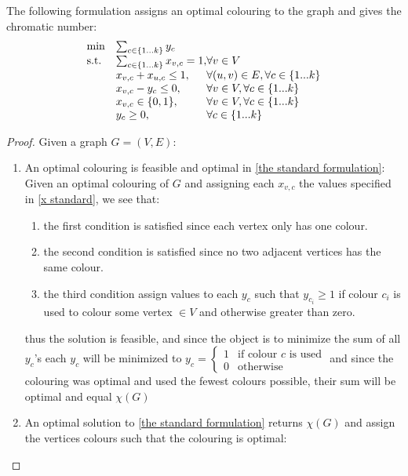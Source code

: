 \begin{proposition}
The following formulation assigns an optimal colouring to the graph and gives the chromatic number:
\begin{align}\label{the standard formulation}
\begin{array}{ll@{}ll}
\text{min} &\sum_{c\in \{1...k\}} y_c&\\
\text{s.t.} 
&\sum_{c\in \{1...k\}}{x_{v,c}} = 1,& \forall v \in V\\
&x_{v,c} + x_{u,c} \leq 1,& \forall (u,v)\in E, \forall c \in \{1...k\}\\
&x_{v,c} - y_c \leq 0,& \forall v \in V,\forall c \in \{1...k\}\\
&x_{v,c}\in\{0,1\},& \forall v \in V, \forall c \in \{1...k\}\\
&y_c \geq 0,& \forall c \in \{1...k\}\\
\end{array}
\end{align}
\begin{proof}
Given a graph $G = (V,E)$:
\begin{enumerate}
\item An optimal colouring is feasible and optimal in \ref{the standard formulation}:\\
Given an optimal colouring of $G$ and assigning each $x_{v,c}$ the values specified in \ref{x standard}, we see that:
\begin{enumerate}
\item the first condition is satisfied since each vertex only has one colour.
\item the second condition is satisfied since no two adjacent vertices has the same colour.
\item the third condition assign values to each $y_c$ such that $y_{c_i} \geq 1$ if colour $c_i$ is used to colour some vertex $\in V$ and otherwise greater than zero.
\end{enumerate}
thus the solution is feasible, and since the object is to minimize the sum of all $y_c$'s each $y_c$ will be minimized to 
$y_c =\left\{
\begin{array}{ll}
1 & \text{if colour }c \text{ is used} \\ 0 & \text{otherwise}
\end{array}\right. $ and since the colouring was optimal and used the fewest colours possible, their sum will be optimal and equal $\chi(G)$ 
\item An optimal solution to \ref{the standard formulation} returns $\chi(G)$ and assign the vertices colours such that the colouring is optimal:\\

\end{enumerate}
\end{proof}
\end{proposition}

